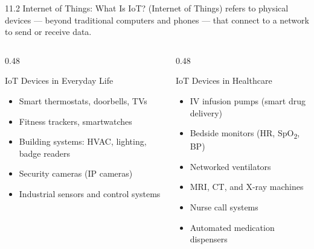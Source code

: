 \documentclass[aspectratio=169]{beamer}  %
\begin{document}

\begin{frame}{11.2 Internet of Things: What Is IoT?}
    \footnotesize
     (Internet of Things) refers to physical devices --- beyond traditional computers and phones --- that connect to a network to send or receive data.

    \vspace{0.3em}
    \begin{columns}[T]
        \begin{column}{0.48\textwidth}
            \begin{block}{IoT Devices in Everyday Life}
                \footnotesize
                \begin{itemize}
                    \item Smart thermostats, doorbells, TVs
                    \item Fitness trackers, smartwatches
                    \item Building systems: HVAC, lighting, badge readers
                    \item Security cameras (IP cameras)
                    \item Industrial sensors and control systems
                \end{itemize}
            \end{block}
        \end{column}
        \begin{column}{0.48\textwidth}
            \begin{block}{IoT Devices in Healthcare}
                \footnotesize
                \begin{itemize}
                    \item IV infusion pumps (smart drug delivery)
                    \item Bedside monitors (HR, SpO\textsubscript{2}, BP)
                    \item Networked ventilators
                    \item MRI, CT, and X-ray machines
                    \item Nurse call systems
                    \item Automated medication dispensers
                \end{itemize}
            \end{block}
        \end{column}
    \end{columns}


\end{frame}
\end{document}
